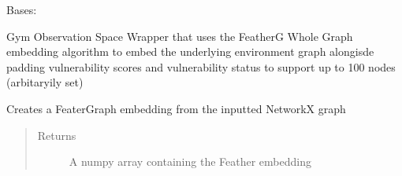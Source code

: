 \documentclass[letterpaper,10pt,english]{sphinxmanual}
\begin{document}
\begin{fulllineitems}
\label{\detokenize{source/yawning_titan.envs.generic.wrappers:yawning_titan.envs.generic.wrappers.graph_embedding_observations.FeatherGraphEmbedObservation}}
\sphinxAtStartPar
Bases: 

\sphinxAtStartPar
Gym Observation Space Wrapper that uses the Feather\sphinxhyphen{}G Whole
Graph embedding algorithm to embed the underlying environment
graph alongisde padding vulnerability scores and vulnerability
status to support up to 100 nodes (arbitaryily set)

\begin{fulllineitems}
\label{\detokenize{source/yawning_titan.envs.generic.wrappers:yawning_titan.envs.generic.wrappers.graph_embedding_observations.FeatherGraphEmbedObservation.make_embedding}}
\sphinxAtStartPar
Creates a FeaterGraph embedding from the inputted
NetworkX graph
\begin{quote}\begin{description}
\item[{Returns}] \leavevmode
\sphinxAtStartPar
A numpy array containing the Feather embedding

\end{description}\end{quote}

\end{fulllineitems}



\end{fulllineitems}
\end{document}
